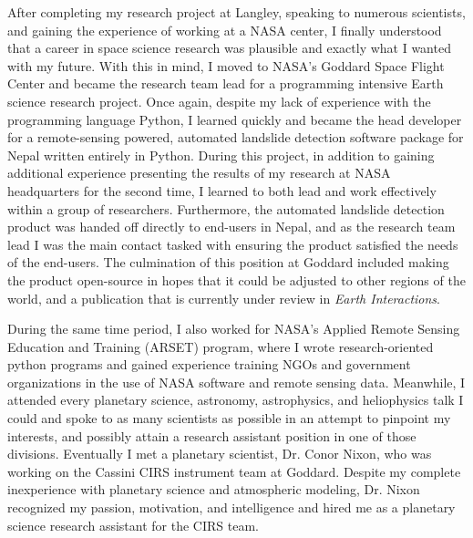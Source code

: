 After completing my research project  at Langley, speaking to numerous
scientists, and gaining the experience of  working at a NASA center, I
finally  understood  that  a  career in  space  science  research  was
plausible and  exactly what  I wanted  with my  future.  With  this in
mind, I  moved to NASA's  Goddard Space  Flight Center and  became the
research team lead for a  programming intensive Earth science research
project.   Once  again,  despite  my   lack  of  experience  with  the
programming language  Python, I  learned quickly  and became  the head
developer for a remote-sensing  powered, automated landslide detection
software package  for Nepal written  entirely in Python.   During this
project, in  addition to gaining additional  experience presenting the
results of  my research at  NASA headquarters  for the second  time, I
learned  to  both  lead  and   work  effectively  within  a  group  of
researchers.  Furthermore,  the automated landslide  detection product
was handed  off directly to  end-users in  Nepal, and as  the research
team lead  I was  the main  contact tasked  with ensuring  the product
satisfied the needs of the end-users. The culmination of this position
at Goddard  included making the  product open-source in hopes  that it
could be  adjusted to other  regions of  the world, and  a publication
that is currently under review in \textit{Earth Interactions}.

During the same  time period, I also worked for  NASA's Applied Remote
Sensing  Education  and  Training   (ARSET)  program,  where  I  wrote
research-oriented python programs and  gained experience training NGOs
and government  organizations in the  use of NASA software  and remote
sensing  data.    Meanwhile,  I  attended  every   planetary  science,
astronomy, astrophysics, and heliophysics talk I could and spoke to as
many scientists  as possible in  an attempt to pinpoint  my interests,
and  possibly attain  a research  assistant position  in one  of those
divisions. Eventually I  met a planetary scientist,  Dr.  Conor Nixon,
who   was   working  on   the   Cassini   CIRS  instrument   team   at
Goddard. Despite  my complete inexperience with  planetary science and
atmospheric modeling, Dr. Nixon recognized my passion, motivation, and
intelligence and  hired me as  a planetary science  research assistant
for the CIRS team.

